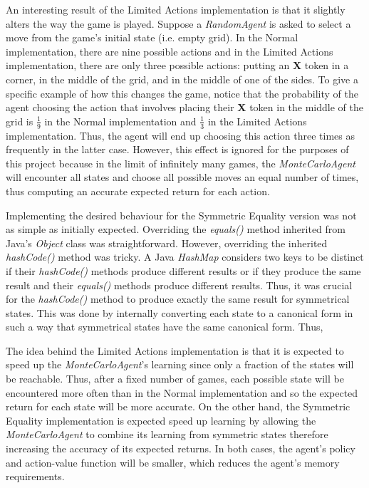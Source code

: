 \documentclass[11pt,a4paper]{report}
\begin{document}
An interesting result of the Limited Actions implementation is that it slightly alters the way the game is played. Suppose a \emph{RandomAgent} is asked to select a move from the game's initial state (i.e. empty grid). In the Normal implementation, there are nine possible actions and in the Limited Actions implementation, there are only three possible actions: putting an \textbf{X} token in a corner, in the middle of the grid, and in the middle of one of the sides. To give a specific example of how this changes the game, notice that the probability of the agent choosing the action that involves placing their \textbf{X} token in the middle of the grid is $\frac{1}{9}$ in the Normal implementation and $\frac{1}{3}$ in the Limited Actions implementation. Thus, the agent will end up choosing this action three times as frequently in the latter case. However, this effect is ignored for the purposes of this project because in the limit of infinitely many games, the \emph{MonteCarloAgent} will encounter all states and choose all possible moves an equal number of times, thus computing an accurate expected return for each action.

Implementing the desired behaviour for the Symmetric Equality version was not as simple as initially expected. Overriding the \emph{equals()} method inherited from Java's \emph{Object} class was straightforward. However, overriding the inherited \emph{hashCode()} method was tricky. A Java \emph{HashMap} considers two keys to be distinct if their \emph{hashCode()} methods produce different results or if they produce the same result and their \emph{equals()} methods produce different results. Thus, it was crucial for the \emph{hashCode()} method to produce exactly the same result for symmetrical states. This was done by internally converting each state to a canonical form in such a way that symmetrical states have the same canonical form. Thus, %


The idea behind the Limited Actions implementation is that it is expected to speed up the \emph{MonteCarloAgent}'s learning since only a fraction of the states will be reachable. Thus, after a fixed number of games, each possible state will be encountered more often than in the Normal implementation and so the expected return for each state will be more accurate. On the other hand, the Symmetric Equality implementation is expected speed up learning by allowing the \emph{MonteCarloAgent} to combine its learning from symmetric states therefore increasing the accuracy of its expected returns. In both cases, the agent's policy and action-value function will be smaller, which reduces the agent's memory requirements.
\end{document}
